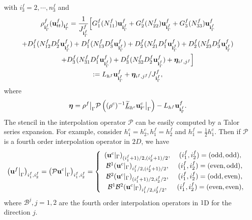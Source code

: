 \documentclass[a4paper]{article}
\newcommand{\wt}{\widetilde}
\begin{document}
with $ i_3^f = 2,\cdots,n_3^f$ and
\begin{multline}\label{fine_scheme_1}
\rho_{{\bf i}^f_{\Gamma}}^f ({\bf u}_{tt}^f)_{{\bf i}^f_{\Gamma}} = \frac{1}{J_{{\bf i}^f_{\Gamma}}^f}\Big[G_1^f(N_{11}^f){\bf u}_{{\bf i}_\Gamma^f}^f+G_2^f(N_{22}^f){\bf u}_{{\bf i}_\Gamma^f}^f
+G_3^f(N_{33}^f){\bf u}_{{\bf i}^f_{\Gamma}}^f\\
+D_1^f(N_{12}^fD_2^f{\bf u}_{{\bf i}^f_{\Gamma}}^f)+D_1^f(N_{13}^fD_3^f{\bf u}_{{\bf i}^f_{\Gamma}}^f)
+D_2^f(N_{21}^fD_1^f{\bf u}_{{\bf i}^f_{\Gamma}}^f)+D_2^f(N_{23}^fD_3^f{\bf u}_{{\bf i}^f_{\Gamma}}^f)\\
+D_3^f(N_{31}^fD_1^f{\bf u}_{{\bf i}^f_{\Gamma}}^f)
+D_3^f(N_{32}^fD_2^f{\bf u}_{{\bf i}^f_{\Gamma}}^f)+{\bm \eta}_{i^f,j^f}\Big]\\
 := L_{h^f}{\bf u}^f_{{\bf i}^f_{\Gamma}}+{\bm \eta}_{i^f,j^f}/J^f_{{\bf i}^f_{\Gamma}},
\end{multline}
where
\begin{equation}\label{eta}
{\bm \eta} = \rho^f\big|_{\Gamma}\mathcal{P}\left((\rho^c)^{-1}\uline{\wt{L}}_{h^c} {\bf{u}}^c_{{\bf i}^c}\big|_{\Gamma}\right) - L_{h^f}{\bf u}^f_{{\bf i}^f_{\Gamma}}.
\end{equation}
The stencil in the interpolation operator $\mathcal{P}$ can be easily computed by a Talor series expansion. For example, consider $h_1^c = h_2^c, h_1^f = h_2^f$ and $h_1^f = \frac{1}{2}h_1^c$. Then if  $\mathcal{P}$ is a fourth order interpolation operator in $2D$, we have
\begin{align}\label{interpolation}
\left({\bf u}^f\big|_{\Gamma}\right)_{i_1^f,i_2^f} = \left(\mathcal{P} {\bf u}^c\big|_{\Gamma}\right)_{i_1^f,i_2^f} = \left\{\begin{array}{cc}
({\bf u}^c|_{\Gamma})_{(i_1^f+1)/2,(i_2^f+1)/2}, &(i_1^f,i_2^f) = (\text{odd},\text{odd}),\\
\mathcal{B}^1 ({\bf u}^c|_{\Gamma})_{i_1^f/2,(i_2^f+1)/2}, &(i_1^f,i_2^f) = (\text{even},\text{odd}),\\
\mathcal{B}^2 ({\bf u}^c|_{\Gamma})_{(i_1^f+1)/2,i_2^f/2},& (i_1^f,i_2^f) = (\text{odd},\text{even}),\\
\mathcal{B}^1\mathcal{B}^2 ({\bf u}^c|_{\Gamma})_{i_1^f/2,i_2^f/2}, & (i_1^f,i_2^f) = (\text{even},\text{even}),
\end{array}\right.
\end{align}
where $\mathcal{B}^j, j = 1,2$ are the fourth order interpolation operators in $1$D for the direction $j$.  
\end{document}
